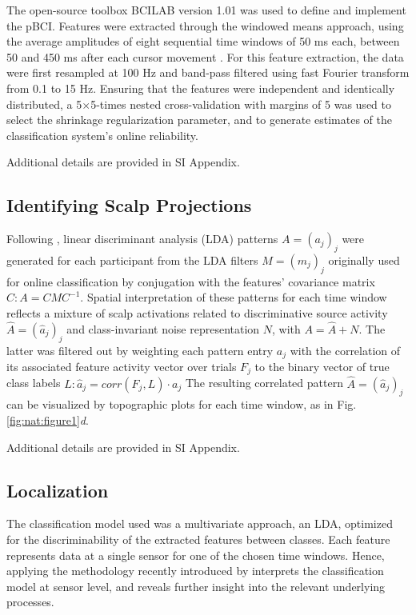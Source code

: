 The open-source toolbox BCILAB \cite{kothe2013bcilab} version 1.01 was used to define and implement the pBCI. Features were extracted through the windowed means approach, using the average amplitudes of eight sequential time windows of 50 ms each, between 50 and 450 ms after each cursor movement \cite{blankertz2011}. For this feature extraction, the data were first resampled at 100 Hz and band-pass filtered using fast Fourier transform from 0.1 to 15 Hz. Ensuring that the features were independent and identically distributed, a 5$\times$5-times nested cross-validation with margins of 5 was used to select the shrinkage regularization parameter, and to generate estimates of the classification system's online reliability.

Additional details are provided in SI Appendix.


\subsection{Identifying Scalp Projections}

Following , linear discriminant analysis (LDA) patterns $A=(a_j)_j$ were generated for each participant from the LDA filters $M=(m_j)_j$ originally used for online classification by conjugation with the features' covariance matrix $C: A=CMC^{−1}$. Spatial interpretation of these patterns for each time window reflects a mixture of scalp activations related to discriminative source activity $\hat{A}=(\hat{a}_j)_j$ and class-invariant noise representation $N$, with $A=\hat{A}+N$. The latter was filtered out by weighting each pattern entry $a_j$ with the correlation of its associated feature activity vector over trials $F_j$ to the binary vector of true class labels $L: \hat{a}_j=corr(F_j,L) \cdot a_j$ The resulting correlated pattern $\hat{A}=(\hat{a}_j)_j$ can be visualized by topographic plots for each time window, as in Fig. \ref{fig:nat:figure1}\emph{d}.

Additional details are provided in SI Appendix.


\subsection{Localization}

The classification model used was a multivariate approach, an LDA, optimized for the discriminability of the extracted features between classes. Each feature represents data at a single sensor for one of the chosen time windows. Hence, applying the methodology recently introduced by  interprets the classification model at sensor level, and reveals further insight into the relevant underlying processes.

